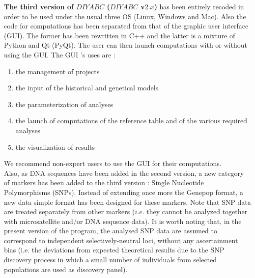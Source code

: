 \documentclass [a4paper]{report}
\begin{document}
 \textbf{The third version of $DIYABC$ ($DIYABC$ v$2.x$)}  has been entirely recoded in order to be used under the usual three OS (Linux, Windows and Mac). Also the code for computations has been separated from that of the graphic user interface (GUI). The former has been rewritten in C++ and the latter is a mixture of Python and Qt (PyQt). The user can then launch computations with or without using the GUI. The GUI 's uses are : 

\begin{enumerate}
\item the management of projects
\item the input of the historical and genetical models
\item the parameterization of analyses
\item the launch of computations  of the reference table and of the various required analyses
\item the visualization of results
\end{enumerate}

We recommend non-expert users to use the GUI for their computations.\\

Also, as DNA sequences have been added in the second version, a new category of markers has been added to the third version : Single Nucleotide Polymorphisms (SNPs). Instead of extending once more the Genepop format, a new data simple format has been designed for these markers. Note that SNP data are treated separately from other markers ($i.e.$ they cannot be analyzed together with microsatellite and/or DNA sequence data). It is worth noting that, in the present version of the program, the analysed SNP data are assumed to correspond to independent selectively-neutral loci, without any ascertainment bias (i.e. the deviations from expected theoretical results due to the SNP discovery process in which a small number of individuals from selected populations are used as discovery panel). \\  
\end{document}
